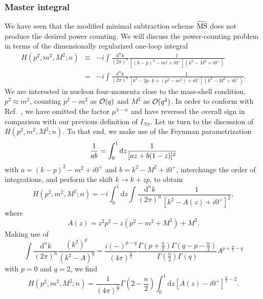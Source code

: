 \documentclass[twoside,12pt]{article}
\begin{document}
\subsubsection{Master integral}
\label{subsubsection_master_integral}
   We have seen that the modified minimal subtraction scheme $\widetilde{\rm MS}$
does not produce the desired power counting.
   We will discuss the power-counting problem in terms of the dimensionally regularized
one-loop integral
\begin{eqnarray}
\label{4:3:2:Hdef}
H(p^2,m^2,M^2;n)
&\equiv& -i\int \frac{\mbox{d}^n
k}{(2\pi)^n} \frac{1}{[(k-p)^2-m^2+i0^+](k^2-M^2+i0^+)}\nonumber\\
&=&-i\int \frac{\mbox{d}^n k}{(2\pi)^n} \frac{1}{[k^2-2p\cdot k
+(p^2-m^2)+i0^+](k^2-M^2+i0^+)}.
\end{eqnarray}
   We are interested in nucleon four-momenta close to the mass-shell condition,
$p^2\approx m^2$, counting $p^2-m^2$ as ${\cal O}(q)$ and $M^2$ as ${\cal O}(q^2)$.
   In order to conform with Ref.~\cite{Becher:1999he}, we have omitted
the factor $\mu^{4-n}$ and have reversed the overall sign in comparison with
our previous definition of $I_{N\pi}$.
   Let us turn to the discussion of $H(p^2,m^2,M^2;n)$.
   To that end, we make use of the Feynman parametrization
\begin{equation}
\label{4:3:2:feynmanparh}
{1\over ab}=\int_0^1 \mbox{d}z  {1\over [az+b(1-z)]^2}
\end{equation}
with $a=(k-p)^2-m^2+i0^+$ and $b=k^2-M^2+i0^+$, interchange the
order of integrations, and perform the shift $k\to k+zp$, to obtain
\begin{displaymath}
H(p^2,m^2,M^2;n)=-i \int_0^1 \mbox{d}z\int\frac{\mbox{d}^n
k}{(2\pi)^n}\frac{1}{[k^2-A(z) +i0^+]^2},
\end{displaymath}
where
\begin{displaymath}
A(z)=z^2 p^2-z(p^2-m^2+M^2)+M^2.
\end{displaymath}
Making use of
\begin{displaymath}
\int \frac{\mbox{d}^n k}{(2\pi)^n} \frac{(k^2)^p}{(k^2-A)^q}
=\frac{i(-)^{p-q}}{(4\pi)^{\frac{n}{2}}}
\frac{\Gamma\left(p+\frac{n}{2}\right)\Gamma\left(q-p-\frac{n}{2}\right)}{
\Gamma\left(\frac{n}{2}\right)\Gamma(q)} A^{p+\frac{n}{2}-q}
\end{displaymath}
with $p=0$ and $q=2$, we find
\begin{equation}
\label{4:3:2:HPmMn}
H(p^2,m^2,M^2;n)=\frac{1}{(4\pi)^{\frac{n}{2}}}
\Gamma\left(2-\frac{n}{2}\right) \int_0^1 \mbox{d}z
[A(z)-i0^+]^{\frac{n}{2}-2}.
\end{equation}
\end{document}
